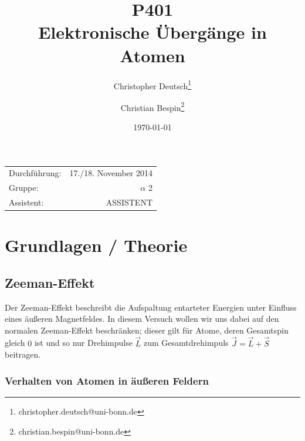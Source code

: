 \documentclass[11pt, a4paper]{article}
\title{P401 \\ Elektronische Übergänge in Atomen}
\author{Christopher Deutsch\footnote{christopher.deutsch@uni-bonn.de} \and Christian Bespin\footnote{christian.bespin@uni-bonn.de}}
\date{\today}
\begin{document}
\begin{titlepage}

\maketitle

\begin{center}
\begin{tabular}{l r}
Durchführung: & 17./18. November 2014 \\
Gruppe: & $\alpha$ 2 \\
Assistent: & ASSISTENT
\end{tabular}
\end{center}

\begin{abstract}
\noindent
\end{abstract}

\end{titlepage}

\tableofcontents
\newpage


\section{Grundlagen / Theorie}

\subsection{Zeeman-Effekt}

Der Zeeman-Effekt beschreibt die Aufspaltung entarteter Energien unter Einfluss eines äußeren Magnetfeldes.
In diesem Versuch wollen wir uns dabei auf den normalen Zeeman-Effekt beschränken; dieser gilt für Atome, deren Gesamtspin gleich $0$ ist und so nur Drehimpulse $\vec{L}$ zum Gesamtdrehimpuls $\vec{J}=\vec{L}+\vec{S}$ beitragen.

\subsubsection{Verhalten von Atomen in äußeren Feldern}
\end{document}
